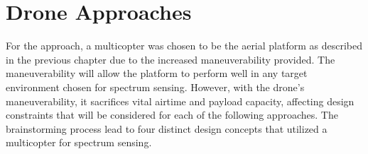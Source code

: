 

\section{Drone Approaches}
For the approach, a multicopter was chosen to be the aerial platform as described in the previous chapter due to the increased maneuverability provided. The maneuverability will allow the platform to perform well in any target environment chosen for spectrum sensing. However, with the drone’s maneuverability, it sacrifices vital airtime and payload capacity, affecting design constraints that will be considered for each of the following approaches. The brainstorming process lead to four distinct design concepts that utilized a multicopter for spectrum sensing. \par

